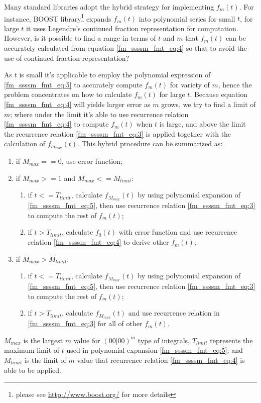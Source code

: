 Many standard libraries adopt the hybrid strategy for implementing $f_{m}(t)$. For instance,
BOOST library\footnote{please see \url{http://www.boost.org/} for more details} expands 
$f_{m}(t)$ into polynomial series for small $t$, for large $t$ it uses
Legendre's continued fraction representation for computation. However, is it possible 
to find a range in terms of $t$ and $m$ that $f_{m}(t)$ can be accurately calculated from
equation \ref{fm_ssssm_fmt_eq:4} so that to avoid the use of continued fraction representation?

As $t$ is small it's applicable to employ the polynomial expression of \ref{fm_ssssm_fmt_eq:5} to 
accurately compute $f_{m}(t)$ for variety of $m$, hence the problem concentrates on how to calculate 
$f_{m}(t)$ for large $t$. Because equation \ref{fm_ssssm_fmt_eq:4} will yields larger error as $m$ grows, 
we try to find a limit of $m$; where under the limit it's able to use recurrence relation
\ref{fm_ssssm_fmt_eq:4} to compute $f_{m}(t)$ when $t$ is large, and above the limit the recurrence 
relation \ref{fm_ssssm_fmt_eq:3} is applied together with the calculation of $f_{m_{\max}}(t)$. This 
hybrid procedure can be summarized as:
\begin{enumerate}
 \item if $M_{max} == 0$, use error function;
 \item if $M_{max} >= 1$ and $M_{max} <= M_{limit}$:
 \begin{enumerate}
  \item if $t<=T_{limit}$, calculate $f_{M_{max}}(t)$ by using polynomial expansion of 
  \ref{fm_ssssm_fmt_eq:5}, then use recurrence relation \ref{fm_ssssm_fmt_eq:3} to compute 
  the rest of $f_{m}(t)$;
  \item if $t>T_{limit}$, calculate $f_{0}(t)$ with error function and 
  use recurrence relation \ref{fm_ssssm_fmt_eq:4} to derive other $f_{m}(t)$;
  \end{enumerate}
 \item if $M_{max} > M_{limit}$:
  \begin{enumerate}
     \item if $t<=T_{limit}$, calculate $f_{M_{max}}(t)$ by using polynomial expansion of 
  \ref{fm_ssssm_fmt_eq:5}, then use recurrence relation \ref{fm_ssssm_fmt_eq:3} to compute 
  the rest of $f_{m}(t)$;
   \item  if $t>T_{limit}$, calculate $f_{M_{max}}(t)$ 
  and use recurrence relation in \ref{fm_ssssm_fmt_eq:3} for all of other $f_{m}(t)$.
  \end{enumerate}
 \end{enumerate}
$M_{max}$ is the largest $m$ value for $(00|00)^{m}$ type of integrals, $T_{limit}$
represents the maximum limit of $t$ used in polynomial expansion \ref{fm_ssssm_fmt_eq:5};
and $M_{limit}$ is the limit of $m$ value that recurrence relation \ref{fm_ssssm_fmt_eq:4}
is able to be applied.


